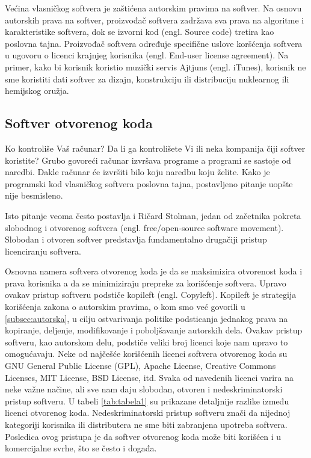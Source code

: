 \documentclass[a4paper]{article}
\begin{document}
Većina vlasničkog softvera je zaštićena autorskim pravima na softver. Na osnovu autorskih prava na softver,
proizvođač softvera zadržava sva prava na algoritme i karakteristike softvera, dok se izvorni kod (engl. Source code)
tretira kao poslovna tajna. Proizvođač softvera određuje specifične uslove koršćenja softvera u ugovoru o licenci 
krajnjeg korisnika (engl. End-user license agreement). Na primer, kako bi korisnik koristio muzički servis Ajtjuns (engl. iTunes),
korisnik ne sme koristiti dati softver za dizajn, konstrukciju ili distribuciju nuklearnog ili hemijskog oružja. \cite{apple}

\subsection{Softver otvorenog koda}
\label{softver_otvorenog_koda}

Ko kontroliše Vaš računar? Da li ga kontrolišete Vi ili neka kompanija čiji softver koristite? Grubo govoreći računar izvršava
programe a programi se sastoje od naredbi. Dakle računar će izvršiti bilo koju naredbu koju želite. Kako je programski kod 
vlasničkog softvera poslovna tajna, postavljeno pitanje uopšte nije besmisleno.

Isto pitanje veoma često postavlja i Ričard Stolman, jedan od začetnika pokreta slobodnog i otvorenog softvera 
(engl. free/open-source software movement). Slobodan i otvoren softver predstavlja fundamentalno drugačiji 
pristup licenciranju softvera.

Osnovna namera softvera otvorenog koda je da se maksimizira otvorenost koda i prava korisnika a da
se minimiziraju prepreke za korišćenje softvera. Upravo ovakav pristup softveru podstiče kopileft (engl. Copyleft).
Kopileft je strategija korišćenja zakona o autorskim pravima, o kom smo već govorili u \ref{subsec:autorska}, u cilju 
ostvarivanja politike podsticanja jednakog prava na kopiranje, deljenje, modifikovanje i poboljšavanje autorskih dela. \cite{copyleft}
Ovakav pristup softveru, kao autorskom delu, podstiče veliki broj licenci koje nam upravo to omogućavaju.
Neke od najčešće korišćenih licenci softvera otvorenog koda su GNU General Public License (GPL), Apache License,
Creative Commons Licenses, MIT License, BSD License, itd. Svaka od navedenih licenci varira na neke važne načine, ali sve nam daju 
slobodan, otvoren i nedeskriminatorski pristup softveru. 
U tabeli \ref{tab:tabela1} su prikazane detaljnije razlike između licenci otvorenog koda. 
Nedeskriminatorski pristup softveru znači da nijednoj
kategoriji korisnika ili distributera ne sme biti zabranjena upotreba softvera. \cite{opensource}
Posledica ovog pristupa je da softver otvorenog koda može biti korišćen i u komercijalne svrhe, što se često i događa.
\end{document}
